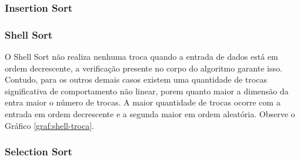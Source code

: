 \documentclass[conference]{IEEEtran}
\begin{document}
\subsubsection{Insertion Sort}

\begin{center}
\end{center}

\subsubsection{Shell Sort}

O Shell Sort não realiza nenhuma troca quando a entrada de dados está em ordem decrescente, a verificação presente no corpo do algoritmo garante isso. Contudo, para os outros demais casos existem uma quantidade de trocas significativa de comportamento não linear, porem quanto maior a dimensão da entra maior o número de trocas. A maior quantidade de trocas ocorre com a entrada em ordem decrescente e a segunda maior em ordem aleatória. Observe o Gráfico \ref{graf:shell-troca}.

\begin{center}
\end{center}

\subsubsection{Selection Sort}
\end{document}
